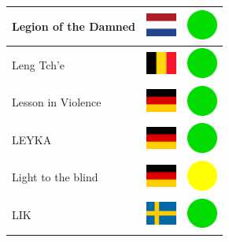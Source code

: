 \documentclass[12pt, a4paper, twoside]{report}
\begin{document}
\begin{center}
\begin{longtable}{|p{5cm}|p{2cm}|p{2cm}|}
 Legion of the Damned                                       & \includegraphics[width=1cm]{../img/flags/nl} &   \includegraphics[width=1cm]{../likes/y} \\ \hline
 Leng Tch'e                                                 & \includegraphics[width=1cm]{../img/flags/be} &   \includegraphics[width=1cm]{../likes/y} \\ \hline
 Lesson in Violence                                         & \includegraphics[width=1cm]{../img/flags/de} &   \includegraphics[width=1cm]{../likes/y} \\ \hline
 LEYKA                                                      & \includegraphics[width=1cm]{../img/flags/de} &   \includegraphics[width=1cm]{../likes/y} \\ \hline
 Light to the blind                                         & \includegraphics[width=1cm]{../img/flags/de} &   \includegraphics[width=1cm]{../likes/m} \\ \hline
 LIK                                                        & \includegraphics[width=1cm]{../img/flags/se} &   \includegraphics[width=1cm]{../likes/y} \\ \hline

\end{longtable}
\end{center}
\end{document}
